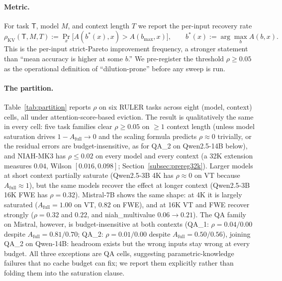 \documentclass{article}
\begin{document}
\paragraph{Metric.} For task $\mathsf{T}$, model $M$, and context length
$T$ we report the per-input recovery rate
\begin{equation}
\rho_{\mathrm{KV}}(\mathsf{T}, M, T) := \Pr_{x}\bigl[A(b^{\ast}(x), x) > A(b_{\max}, x)\bigr],
\qquad b^{\ast}(x) := \arg\max_{b} A(b, x).
\label{eq:rho}
\end{equation}
This is the per-input strict-Pareto improvement frequency, a stronger statement
than ``mean accuracy is higher at some $b$.'' We pre-register the threshold
$\rho \ge 0.05$ as the operational definition of ``dilution-prone'' before any
sweep is run.

\paragraph{The partition.} Table~\ref{tab:partition} reports $\rho$
on six RULER tasks across eight (model, context) cells, all under
attention-score-based eviction. The result is
qualitatively the same in every cell: five task families clear $\rho \ge 0.05$
on $\geq 1$ context length (unless model saturation drives $1 - A_{\mathrm{full}}
\to 0$ and the scaling formula predicts $\rho \approx 0$ trivially, or the
residual errors are budget-insensitive, as for QA\_2 on Qwen2.5-14B below),
and NIAH-MK3 has $\rho \le 0.02$ on every
model and every context (a 32K extension measures $0.04$, Wilson
$[0.016, 0.098]$; Section~\ref{subsec:prereg32k}). Larger models at short
context partially saturate
(Qwen2.5-3B 4K has $\rho \approx 0$ on VT because $A_{\mathrm{full}} \approx 1$),
but the same models recover the effect at longer context (Qwen2.5-3B 16K FWE has
$\rho = 0.32$). Mistral-7B shows the same shape: at 4K it is largely saturated
($A_{\mathrm{full}} = 1.00$ on VT, $0.82$ on FWE), and at 16K VT and FWE
recover strongly ($\rho = 0.32$ and $0.22$, and niah\_multivalue
$0.06 \to 0.21$). The QA family on Mistral, however, is budget-insensitive
at both contexts (QA\_1: $\rho = 0.04 / 0.00$ despite
$A_{\mathrm{full}} = 0.81 / 0.70$; QA\_2: $\rho = 0.01 / 0.00$ despite
$A_{\mathrm{full}} = 0.50 / 0.56$), joining QA\_2 on Qwen-14B: headroom
exists but the wrong inputs stay wrong at every budget. All three
exceptions are QA cells, suggesting parametric-knowledge failures that no
cache budget can fix; we report them explicitly rather than folding them
into the saturation clause.
\end{document}
